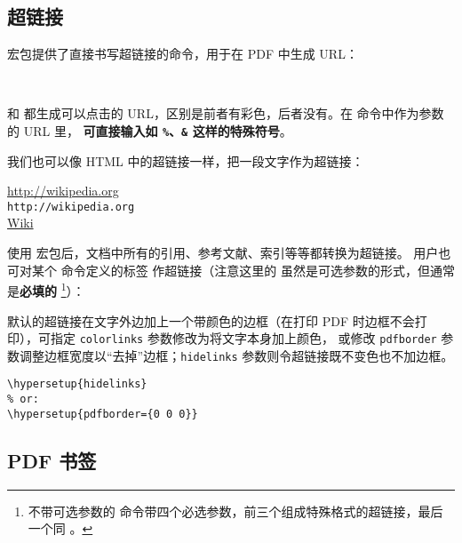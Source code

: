\subsection{超链接}\label{subsec:url-href}

 宏包提供了直接书写超链接的命令，用于在 PDF 中生成 URL：
\begin{command}
 \\
\end{command}

 和  都生成可以点击的 URL，区别是前者有彩色，后者没有。在  命令中作为参数的 URL 里，
\textbf{可直接输入如 \texttt\%、\texttt\& 这样的特殊符号}。

我们也可以像 HTML 中的超链接一样，把一段文字作为超链接：
\begin{command}
\end{command}

\begin{example}
\url{http://wikipedia.org} \\
\nolinkurl{http://wikipedia.org} \\
\href{http://wikipedia.org}{Wiki}
\end{example}

使用  宏包后，文档中所有的引用、参考文献、索引等等都转换为超链接。
用户也可对某个  命令定义的标签  作超链接（注意这里的  虽然是可选参数的形式，但通常是\textbf{必填的}%
\footnote{不带可选参数的  命令带四个必选参数，前三个组成特殊格式的超链接，最后一个同 。}）：
\begin{command}
\end{command}

默认的超链接在文字外边加上一个带颜色的边框（在打印 PDF 时边框不会打印），可指定 \texttt{color\-links} 参数修改为将文字本身加上颜色，
或修改 \texttt{pdf\-border} 参数调整边框宽度以“去掉”边框；\texttt{hide\-links} 参数则令超链接既不变色也不加边框。
\begin{verbatim}
\hypersetup{hidelinks}
% or:
\hypersetup{pdfborder={0 0 0}}
\end{verbatim}

\subsection{PDF 书签}\label{subsec:pdf-bookmark}

